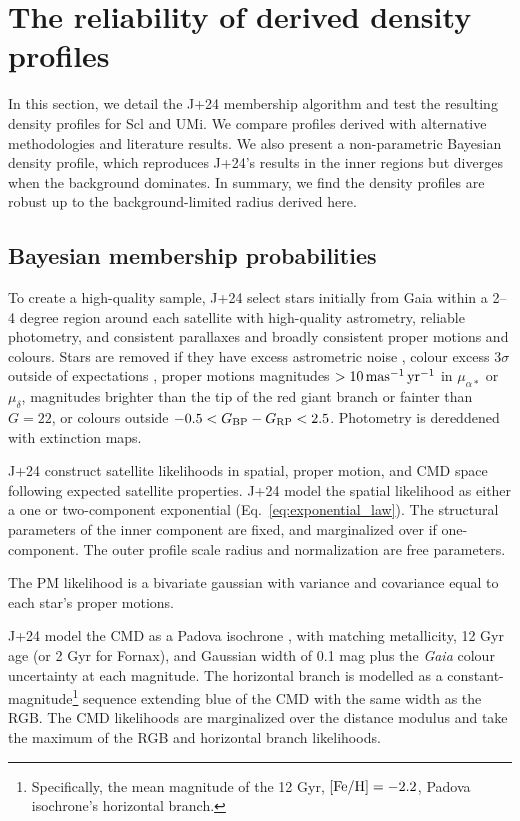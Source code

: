 \chapter{The reliability of derived density
profiles}\label{sec:extra_density}

In this section, we detail the J+24 membership algorithm and test the
resulting density profiles for Scl and UMi. We compare profiles derived
with alternative methodologies and literature results. We also present a
non-parametric Bayesian density profile, which reproduces J+24's results
in the inner regions but diverges when the background dominates. In
summary, we find the density profiles are robust up to the
background-limited radius derived here.

\section{Bayesian membership
probabilities}\label{bayesian-membership-probabilities}

To create a high-quality sample, J+24 select stars initially from Gaia
within a 2--4 degree region around each satellite with high-quality
astrometry, reliable photometry, and consistent parallaxes and broadly
consistent proper motions and colours. Stars are removed if they have
excess astrometric noise \citep[\({\rm ruwe} > 1.3\),
see][]{lindegren+2021}, colour excess \(3\sigma\) outside of
expectations \citep[from][]{riello+2021}, proper motions magnitudes
\(>10\,{\rm mas^{-1}\,yr^{-1}}\) in \(\mu_{\alpha*}\) or \(\mu_\delta\), magnitudes
brighter than the tip of the red giant branch or fainter than \(G=22\),
or colours outside \(-0.5 < G_{\rm BP} - G_{\rm RP} <  2.5\). Photometry
is dereddened with \citet{schlegel+finkbeiner+davis1998} extinction
maps.

J+24 construct satellite likelihoods in spatial, proper motion, and CMD
space following expected satellite properties. J+24 model the spatial
likelihood as either a one or two-component exponential
(Eq.~\ref{eq:exponential_law}). The structural parameters of the inner
component are fixed, and marginalized over if one-component. The outer
profile scale radius and normalization are free parameters.

The PM likelihood is a bivariate gaussian with variance and covariance
equal to each star's proper motions.

J+24 model the CMD as a Padova isochrone \citep{girardi+2002}, with
matching metallicity, 12 Gyr age (or 2 Gyr for Fornax), and Gaussian
width of 0.1 mag plus the \emph{Gaia} colour uncertainty at each
magnitude. The horizontal branch is modelled as a
constant-magnitude\footnote{Specifically, the mean magnitude of the 12
  Gyr, \({\rm [Fe/H]}=-2.2\), Padova isochrone's horizontal branch.}
sequence extending blue of the CMD with the same width as the RGB. The
CMD likelihoods are marginalized over the distance modulus and take the
maximum of the RGB and horizontal branch likelihoods.

